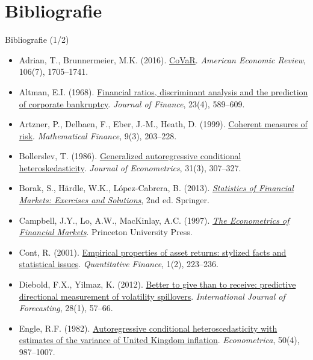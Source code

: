 \section{Bibliografie}

\begin{frame}{Bibliografie (1/2)}
\itemsize{\tiny}
\begin{itemize}
    \item Adrian, T., Brunnermeier, M.K. (2016). \href{https://doi.org/10.1257/aer.20120555}{CoVaR}. \textit{American Economic Review}, 106(7), 1705--1741.
    \item Altman, E.I. (1968). \href{https://doi.org/10.1111/j.1540-6261.1968.tb00843.x}{Financial ratios, discriminant analysis and the prediction of corporate bankruptcy}. \textit{Journal of Finance}, 23(4), 589--609.
    \item Artzner, P., Delbaen, F., Eber, J.-M., Heath, D. (1999). \href{https://doi.org/10.1111/1467-9965.00068}{Coherent measures of risk}. \textit{Mathematical Finance}, 9(3), 203--228.
    \item Bollerslev, T. (1986). \href{https://doi.org/10.1016/0304-4076(86)90063-1}{Generalized autoregressive conditional heteroskedasticity}. \textit{Journal of Econometrics}, 31(3), 307--327.
    \item Borak, S., Härdle, W.K., López-Cabrera, B. (2013). \href{https://doi.org/10.1007/978-3-642-33929-5}{\textit{Statistics of Financial Markets: Exercises and Solutions}}, 2nd ed. Springer.
    \item Campbell, J.Y., Lo, A.W., MacKinlay, A.C. (1997). \href{https://doi.org/10.1515/9781400830213}{\textit{The Econometrics of Financial Markets}}. Princeton University Press.
    \item Cont, R. (2001). \href{https://doi.org/10.1080/713665670}{Empirical properties of asset returns: stylized facts and statistical issues}. \textit{Quantitative Finance}, 1(2), 223--236.
    \item Diebold, F.X., Yilmaz, K. (2012). \href{https://doi.org/10.1016/j.ijforecast.2011.02.006}{Better to give than to receive: predictive directional measurement of volatility spillovers}. \textit{International Journal of Forecasting}, 28(1), 57--66.
    \item Engle, R.F. (1982). \href{https://doi.org/10.2307/1912773}{Autoregressive conditional heteroscedasticity with estimates of the variance of United Kingdom inflation}. \textit{Econometrica}, 50(4), 987--1007.

\end{itemize}
\end{frame}
